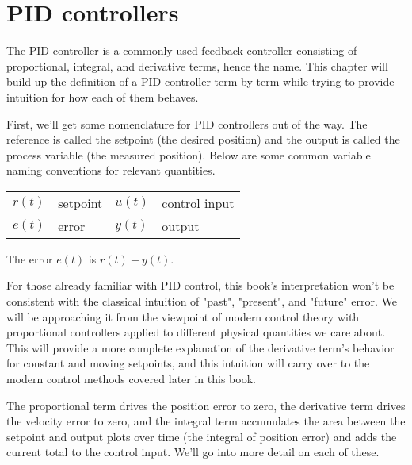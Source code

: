 
\chapter{PID controllers}

The PID controller is a commonly used feedback controller consisting of
proportional, integral, and derivative terms, hence the name. This chapter will
build up the definition of a PID controller term by term while trying to provide
intuition for how each of them behaves.

First, we'll get some nomenclature for PID controllers out of the way. The
\gls{reference} is called the \gls{setpoint} (the desired position) and the
\gls{output} is called the \gls{process variable} (the measured position). Below
are some common variable naming conventions for relevant quantities.

\begin{figurekey}
  \begin{tabular}{llll}
    $r(t)$ & \gls{setpoint} & $u(t)$ & \gls{control input} \\
    $e(t)$ & \gls{error} & $y(t)$ & \gls{output}
  \end{tabular}
\end{figurekey}

The \gls{error} $e(t)$ is $r(t) - y(t)$.

For those already familiar with PID control, this book's interpretation won't be
consistent with the classical intuition of "past", "present", and "future"
error. We will be approaching it from the viewpoint of modern control theory
with proportional controllers applied to different physical quantities we care
about. This will provide a more complete explanation of the derivative term's
behavior for constant and moving \glspl{setpoint}, and this intuition will carry
over to the modern control methods covered later in this book.

The proportional term drives the position error to zero, the derivative term
drives the velocity error to zero, and the integral term accumulates the area
between the \gls{setpoint} and \gls{output} plots over time (the integral of
position \gls{error}) and adds the current total to the \gls{control input}.
We'll go into more detail on each of these.

\renewcommand*{\chapterpath}{\partpath/pid-controllers}








